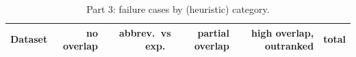 \begin{table}[ht]\centering\small
\begin{tabular}{lrrrrr}\toprule
Dataset & no overlap & abbrev.\ vs exp.\ & partial overlap & high overlap, outranked & total \\ \midrule

\bottomrule\end{tabular}
\caption{Part 3: failure cases by (heuristic) category.}\label{tab:p3cats}\end{table}

